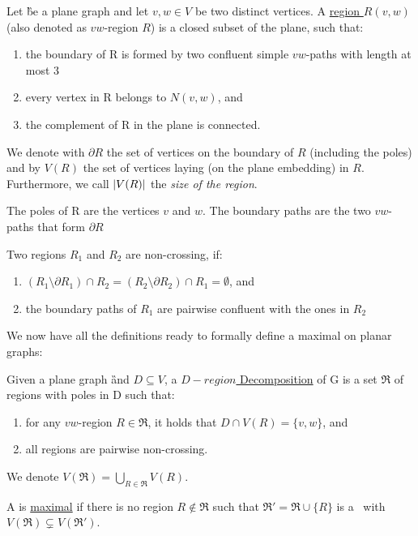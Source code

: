 
\begin{definition}
    Let \G be a plane graph and let $v,w \in V$ be two distinct vertices. A \underline{region $R(v,w)$} (also denoted as $vw$-region $R$) is a closed subset of the plane, such that:
    \begin{enumerate}
        \item the boundary of R is formed by two confluent simple $vw$-paths with length at most 3
        \item every vertex in R belongs to $N(v,w)$, and
        \item the complement of R in the plane is connected.
    \end{enumerate}
    
    We denote with $\partial R$ the set of vertices on the boundary of $R$ (including the poles) and by $V(R)$ the set of vertices laying (on the plane embedding) in $R$. Furthermore, we call $\abs{V(R)}$ the \textit{size of the region}.
    
    The poles of R are the vertices $v$ and $w$. The boundary paths are the two $vw$-paths that form $\partial R$
    
\end{definition}

\begin{definition}
    Two regions $R_1$ and $R_2$ are non-crossing, if:
    \begin{enumerate}
        \item $(R_1 \setminus \partial R_1) \cap R_2 = (R_2 \setminus \partial R_2) \cap R_1 = \emptyset$, and
        \item the boundary paths of $R_1$ are pairwise confluent with the ones in $R_2$
    \end{enumerate}
\end{definition}

We now have all the definitions ready to formally define a maximal \dreg on planar graphs:

\begin{definition}\label{def:region}
    Given a plane graph \G and $D\subseteq V$, a \underline{$D-region$ Decomposition} of G is a set $\mathfrak{R}$ of regions with poles in D such that: 
    \begin{enumerate}
        \item for any $vw$-region $R \in \mathfrak{R} $, it holds that $D \cap V(R) = \{v, w\}$, and
        \item all regions are pairwise non-crossing.
    \end{enumerate}
    We denote $V(\mathfrak{R}) = \bigcup\limits_{R \in \mathfrak{R}} V(R)$. 
    
    \noindent A \dreg is \underline{maximal} if there is no region $R \notin \mathfrak{R}$ such that $\mathfrak{R}' = \mathfrak{R} \cup \{R\}$ is a \dreg~with $V(\mathfrak{R}) \subsetneq V(\mathfrak{R}')$.
\end{definition}


